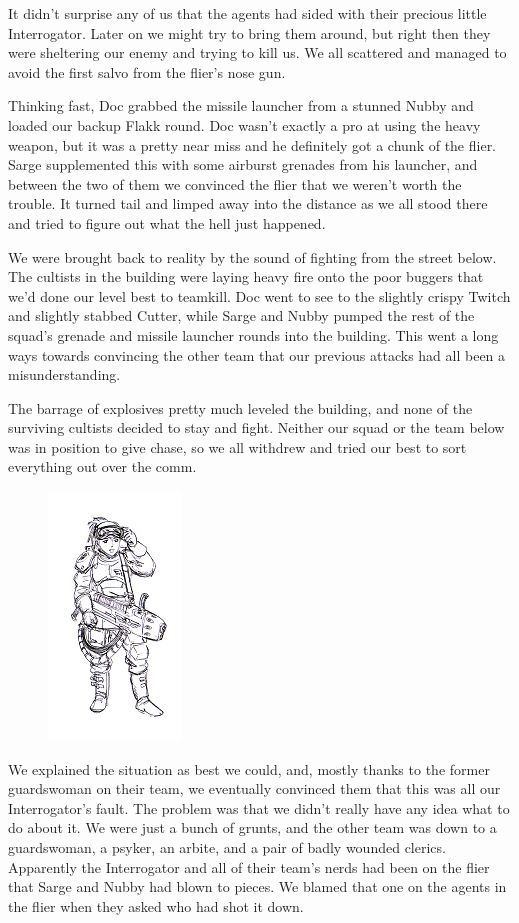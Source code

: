 It didn’t surprise any of us that the agents had sided with their precious little Interrogator. 
Later on we might try to bring them around, but right then they were sheltering our enemy and trying to kill us. 
We all scattered and managed to avoid the first salvo from the flier’s nose gun.

Thinking fast, Doc grabbed the missile launcher from a stunned Nubby and loaded our backup Flakk round. 
Doc wasn’t exactly a pro at using the heavy weapon, but it was a pretty near miss and he definitely got a chunk of the flier. 
Sarge supplemented this with some airburst grenades from his launcher, and between the two of them we convinced the flier that we weren’t worth the trouble. 
It turned tail and limped away into the distance as we all stood there and tried to figure out what the hell just happened.

We were brought back to reality by the sound of fighting from the street below. 
The cultists in the building were laying heavy fire onto the poor buggers that we’d done our level best to teamkill. 
Doc went to see to the slightly crispy Twitch and slightly stabbed Cutter, while Sarge and Nubby pumped the rest of the squad’s grenade and missile launcher rounds into the building. 
This went a long ways towards convincing the other team that our previous attacks had all been a misunderstanding.

The barrage of explosives pretty much leveled the building, and none of the surviving cultists decided to stay and fight. 
Neither our squad or the team below was in position to give chase, so we all withdrew and tried our best to sort everything out over the comm.

\begin{figure}
	\begin{center}
		\includegraphics[width=\figwidth]{pics/5/24.png}
	\end{center}
\end{figure}
We explained the situation as best we could, and, mostly thanks to the former guardswoman on their team, we eventually convinced them that this was all our Interrogator’s fault. 
The problem was that we didn’t really have any idea what to do about it.
We were just a bunch of grunts, and the other team was down to a guardswoman, a psyker, an arbite, and a pair of badly wounded clerics. 
Apparently the Interrogator and all of their team’s nerds had been on the flier that Sarge and Nubby had blown to pieces. We blamed that one on the agents in the flier when they asked who had shot it down.

